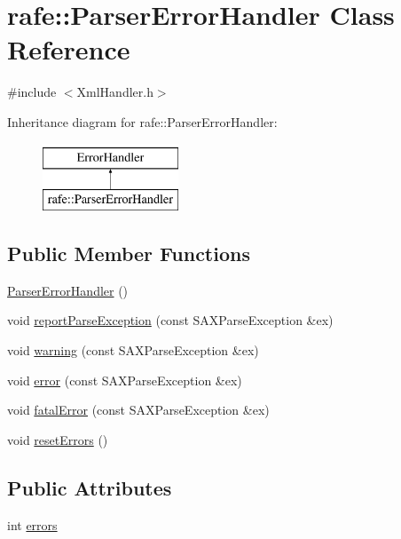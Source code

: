 \hypertarget{classrafe_1_1_parser_error_handler}{\section{rafe\+:\+:Parser\+Error\+Handler Class Reference}
\label{classrafe_1_1_parser_error_handler}
}


{\ttfamily \#include $<$Xml\+Handler.\+h$>$}

Inheritance diagram for rafe\+:\+:Parser\+Error\+Handler\+:\begin{figure}[H]
\begin{center}
\leavevmode
\includegraphics[height=2.000000cm]{classrafe_1_1_parser_error_handler}
\end{center}
\end{figure}
\subsection*{Public Member Functions}
\begin{DoxyCompactItemize}
\item 
\hyperlink{classrafe_1_1_parser_error_handler_a875a6ac56b59145378d4b2685f84ecb9}{Parser\+Error\+Handler} ()
\item 
void \hyperlink{classrafe_1_1_parser_error_handler_ab9807d119bb60ca2252ccdeac17637b8}{report\+Parse\+Exception} (const S\+A\+X\+Parse\+Exception \&ex)
\item 
void \hyperlink{classrafe_1_1_parser_error_handler_ab14d4e9a800f22af2698f13a3801a280}{warning} (const S\+A\+X\+Parse\+Exception \&ex)
\item 
void \hyperlink{classrafe_1_1_parser_error_handler_a974066afd1bef8087e80b4f075b7f0c2}{error} (const S\+A\+X\+Parse\+Exception \&ex)
\item 
void \hyperlink{classrafe_1_1_parser_error_handler_a55b044feacb8f734c08509be5d02c29d}{fatal\+Error} (const S\+A\+X\+Parse\+Exception \&ex)
\item 
void \hyperlink{classrafe_1_1_parser_error_handler_a02398bf9ec9b0bb9e772b5ffed1a3cdb}{reset\+Errors} ()
\end{DoxyCompactItemize}
\subsection*{Public Attributes}
\begin{DoxyCompactItemize}
\item 
int \hyperlink{classrafe_1_1_parser_error_handler_aee43a1438f6c79430cad5776220938ce}{errors}
\end{DoxyCompactItemize}


